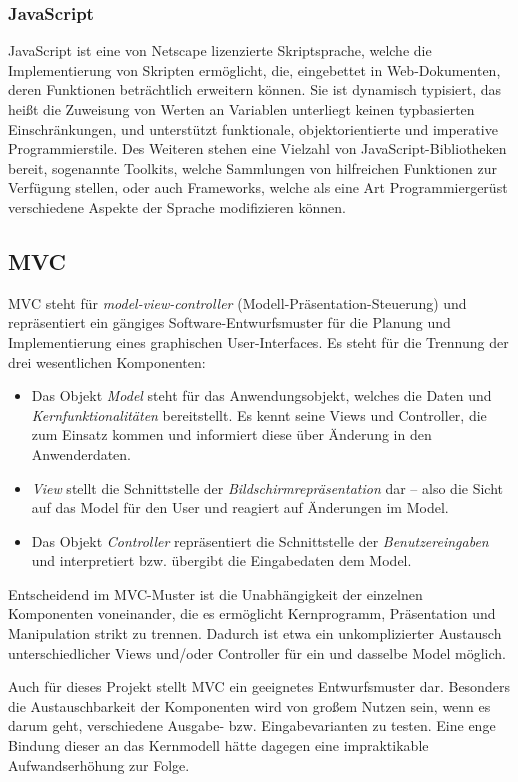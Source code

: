 \subsubsection{JavaScript}
JavaScript ist eine von Netscape lizenzierte Skriptsprache, welche die Implementierung von Skripten ermöglicht, die, eingebettet in Web-Dokumenten, deren Funktionen beträchtlich erweitern können. Sie ist dynamisch typisiert, das heißt die Zuweisung von Werten an Variablen unterliegt keinen typbasierten Einschränkungen, und unterstützt funktionale, objektorientierte und imperative Programmierstile. Des Weiteren stehen eine Vielzahl von JavaScript-Bibliotheken bereit, sogenannte Toolkits, welche Sammlungen von hilfreichen Funktionen zur Verfügung stellen, oder auch Frameworks, welche als eine Art Programmiergerüst verschiedene Aspekte der Sprache modifizieren können. \cite{js-selfhtml,js-wiki}

\subsection{MVC}
MVC steht für \emph{model-view-controller} (Modell-Präsentation-Steuerung) und repräsentiert ein gängiges Software-Entwurfsmuster für die Planung und Implementierung eines graphischen User-Interfaces. Es steht für die Trennung der drei wesentlichen Komponenten: 
\begin{itemize}
\item
Das Objekt \emph{Model} steht für das Anwendungsobjekt, welches die Daten und \emph{Kernfunktionalitäten} bereitstellt. Es kennt seine Views und Controller, die zum Einsatz kommen und informiert diese über Änderung in den Anwenderdaten.
\item
\emph{View} stellt die Schnittstelle der \emph{Bildschirmrepräsentation} dar – also die Sicht auf das Model für den User und reagiert auf Änderungen im Model. 
\item
Das Objekt \emph{Controller} repräsentiert die Schnittstelle der \emph{Benutzereingaben} und interpretiert bzw. übergibt die Eingabedaten dem Model.
\end{itemize}

Entscheidend im MVC-Muster ist die Unabhängigkeit der einzelnen Komponenten voneinander, die es ermöglicht Kernprogramm, Präsentation und Manipulation strikt zu trennen. Dadurch ist etwa ein unkomplizierter Austausch unterschiedlicher Views und/oder Controller für ein und dasselbe Model möglich.

Auch für dieses Projekt stellt MVC ein geeignetes Entwurfsmuster dar. Besonders die Austauschbarkeit der Komponenten wird von großem Nutzen sein, wenn es darum geht, verschiedene Ausgabe- bzw. Eingabevarianten zu testen. Eine enge Bindung dieser an das Kernmodell hätte dagegen eine impraktikable Aufwandserhöhung zur Folge. \cite{mup-mvc,mvc-example}





